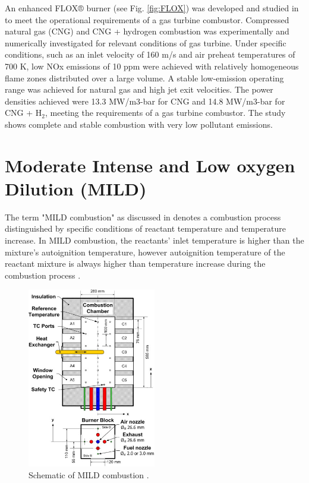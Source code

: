 An enhanced FLOX® burner (see Fig. \ref{fig:FLOX}) was developed and studied in \cite{LAMMEL4001825} to meet the operational requirements of a gas turbine combustor. Compressed natural gas (CNG) and CNG + hydrogen combustion was experimentally and numerically investigated for relevant conditions of gas turbine. Under specific conditions, such as an inlet velocity of 160 m/s and air preheat temperatures of 700 K, low NOx emissions of 10 ppm were achieved with relatively homogeneous flame zones distributed over a large volume. A stable low-emission operating range was achieved for natural gas and high jet exit velocities.  The power densities achieved were 13.3 MW/m3-bar for CNG and 14.8 MW/m3-bar for CNG + H$_2$, meeting the requirements of a gas turbine combustor. The study shows complete and stable combustion with very low pollutant emissions.

\section{Moderate Intense and Low oxygen Dilution (MILD)}

The term "MILD combustion" as discussed in \cite{CAVALIERE2004329} denotes a combustion process distinguished by specific conditions of reactant temperature and temperature increase. In MILD combustion, the reactants' inlet temperature is higher than the mixture's autoignition temperature, however autoignition temperature of the reactant mixture is always higher than temperature increase during the combustion process \cite{doi:10.1021/acs.energyfuels.7b03607}.

\begin{figure}
    \centering
    \includegraphics[width=0.5\textwidth]{Chapter2/Images/MILD.jpg}
    \caption[Schematic of MILD combustion]{Schematic of MILD combustion \cite{SZEGO2009429}.}
    \label{fig:MILD}
\end{figure}

